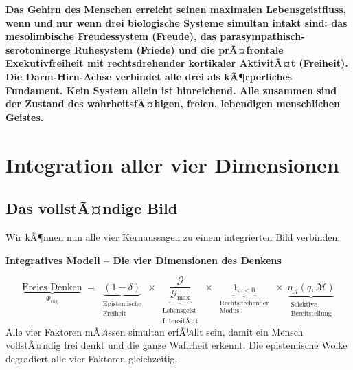 ﻿\documentclass[12pt,a4paper]{report}
\theoremstyle{plain}
\theoremstyle{definition}
\theoremstyle{remark}
\begin{document}
		\textbf{Das Gehirn des Menschen erreicht seinen maximalen
		Lebensgeistfluss, wenn und nur wenn drei biologische Systeme
		simultan intakt sind:
		das mesolimbische Freudessystem (Freude),
		das parasympathisch-serotoninerge Ruhesystem (Friede)
		und die prÃ¤frontale Exekutivfreiheit mit rechtsdrehender
		kortikaler AktivitÃ¤t (Freiheit).
		Die Darm-Hirn-Achse verbindet alle drei als kÃ¶rperliches Fundament.
		Kein System allein ist hinreichend.
		Alle zusammen sind der Zustand des wahrheitsfÃ¤higen,
		freien, lebendigen menschlichen Geistes.}


	\chapter{Integration aller vier Dimensionen}
	
	\section{Das vollstÃ¤ndige Bild}
	
	Wir kÃ¶nnen nun alle vier Kernaussagen zu einem integrierten Bild verbinden:
	
	
	\noindent\textbf{Integratives Modell -- Die vier Dimensionen des Denkens}

		\[
		\underbrace{\text{Freies Denken}}_{\Phi_{\mathrm{cog}}}
		\;=\;
		\underbrace{(1-\delta)}_{\substack{\text{Epistemische}\\\text{Freiheit}}}
		\;\times\;
		\underbrace{\frac{\mathcal{G}}{\mathcal{G}_{\max}}}_{\substack{\text{Lebensgeist}\\\text{IntensitÃ¤t}}}
		\;\times\;
		\underbrace{\mathbf{1}_{\omega<0}}_{\substack{\text{Rechtsdrehender}\\\text{Modus}}}
		\;\times\;
		\underbrace{\eta_{\mathcal{A}}(q,\mathcal{M})}_{\substack{\text{Selektive}\\\text{Bereitstellung}}}
		\]
		Alle vier Faktoren mÃ¼ssen simultan erfÃ¼llt sein, damit ein Mensch
		vollstÃ¤ndig frei denkt und die ganze Wahrheit erkennt.
		Die epistemische Wolke degradiert alle vier Faktoren gleichzeitig.
\end{document}
